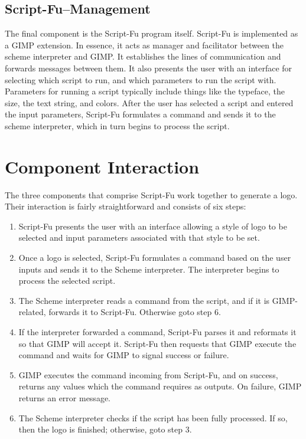 \documentclass{article}
\begin{document}
\subsection{Script-Fu--Management}

The final component is the Script-Fu program itself.  Script-Fu is
implemented as a GIMP extension.  In essence, it acts as manager and
facilitator between the scheme interpreter and GIMP.  It establishes
the lines of communication and forwards messages between them.  It
also presents the user with an interface for selecting which script to
run, and which parameters to run the script with.  Parameters for
running a script typically include things like the typeface, the size,
the text string, and colors.  After the user has selected a script and
entered the input parameters, Script-Fu formulates a command and sends
it to the scheme interpreter, which in turn begins to process the
script.

\section{Component Interaction}

The three components that comprise Script-Fu work together to generate
a logo.  Their interaction is fairly straightforward and consists of
six steps:

\begin{enumerate}
\item Script-Fu presents the user with an interface allowing a
style of logo to be selected and input parameters associated with that
style to be set.
\item Once a logo is selected, Script-Fu formulates a command based on
the user inputs and sends it to the Scheme interpreter.  The
interpreter begins to process the selected script.
\item The Scheme interpreter reads a command from the script,
and if it is GIMP-related, forwards it to Script-Fu.  Otherwise goto
step 6.
\item If the interpreter forwarded a command, Script-Fu parses it and
reformats it so that GIMP will accept it.  Script-Fu then requests
that GIMP execute the command and waits for GIMP to signal success or
failure.
\item GIMP executes the command incoming from Script-Fu, and on
success, returns any values which the command requires as outputs.  On
failure, GIMP returns an error message.
\item The Scheme interpreter checks if the script has been fully
processed.  If so, then the logo is finished; otherwise, goto step 3.
\end{enumerate}
\end{document}
